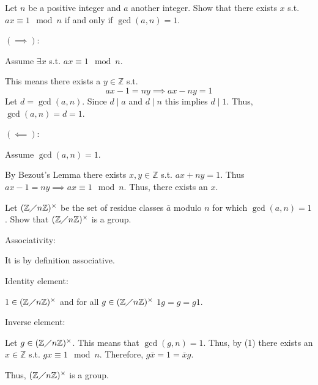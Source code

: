 \documentclass[12pt, letterpaper]{article}
\newcommand{\Z}{\mathbb{Z}}
\begin{document}
\qh
\begin{subproblem}{}
    Let $n$ be a positive integer and $a$ another integer. Show that there exists $x$ s.t. $ax \equiv 1 \mod n$ if and only if $\gcd(a,n) = 1$.
\end{subproblem}
\begin{problemproof}
    $(\implies)$:

    Assume $\exists x$ s.t. $ax \equiv 1 \mod n$.

    This means there exists a $y \in \Z$ s.t.
    \[ax - 1 = ny \implies ax-ny = 1\]
    Let $d=\gcd(a,n)$. Since $d \mid a$ and $d \mid n$ this implies $d\mid 1$. Thus, $\gcd(a,n) = d = 1$.

    $(\impliedby)$:

    Assume $\gcd(a,n) = 1$.

    By Bezout's Lemma there exists $x,y \in \Z$ s.t. $ax+ny = 1$. Thus $ax - 1 = ny \implies ax \equiv 1 \mod n$.
    Thus, there exists an $x$.
\end{problemproof}

\begin{subproblem}{}
    Let $(\Z \diagup n\Z)^\times$ be the set of residue classes $\bar{a}$ modulo $n$ for which $\gcd(a,n)=1$. Show that $(\Z \diagup n \Z)^{\times}$ is a group.
\end{subproblem}
\begin{problemproof}
    Associativity:

    It is by definition associative.

    Identity element:

    $1 \in (\Z \diagup n\Z)^\times$ and for all $g \in (\Z \diagup n\Z)^\times$ $1g=g=g1$.

    Inverse element:

    Let $g \in (\Z \diagup n\Z)^\times$. This means that $\gcd(g,n)=1$. Thus, by (1) there exists an $x \in \Z$ s.t. $gx \equiv 1 \mod n$. Therefore, $g\bar{x}=1=\bar{x}g$.
    
    Thus, $(\Z \diagup n\Z)^\times$ is a group.
\end{problemproof}
\end{document}
